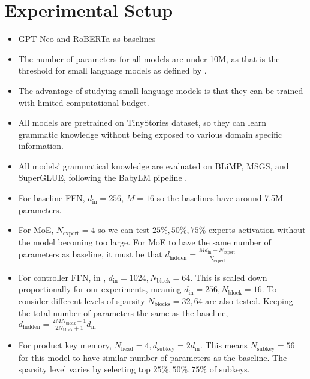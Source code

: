 \section{Experimental Setup}
\label{sec:setup}
\begin{itemize}
    \item GPT-Neo and RoBERTa as baselines
    \item The number of parameters for all models are under 10M, as that is the threshold for small language models as defined by \cite{eldan_tinystories_2023}.
    \item The advantage of studying small language models is that they can be trained with limited computational budget.
    \item All models are pretrained on TinyStories \cite{eldan_tinystories_2023} dataset, so they can learn grammatic knowledge without being exposed to various domain specific information.
    \item All models' grammatical knowledge are evaluated on BLiMP, MSGS, and SuperGLUE, following the BabyLM pipeline \cite{warstadt_findings_2023}.
    \item For baseline FFN, $d_\text{in} = 256$, $M=16$ so the baselines have around 7.5M parameters.
    \item For MoE, $N_\text{expert}=4$ so we can test $25\%, 50\%, 75\%$ experts activation without the model becoming too large. For MoE to have the same number of parameters as baseline, it must be that $d_\text{hidden} = \frac{Md_\text{in}-N_\text{expert}}{N_\text{expert}}$
    \item For controller FFN, in \cite{jaszczur_sparse_2021}, $d_\text{in} = 1024, N_\text{block}=64$. This is scaled down proportionally for our experiments, meaning $d_\text{in} = 256, N_\text{block}=16$. To consider different levels of sparsity $N_\text{blocks}=32,64$ are also tested. Keeping the total number of parameters the same as the baseline, $d_\text{hidden} = \frac{2MN_\text{block}-1}{2N_\text{block}+1}d_\text{in}$
    \item For product key memory, $N_\text{head}=4,d_\text{subkey}=2d_\text{in}$. This means $N_\text{subkey}= 56$ for this model to have similar number of parameters as the baseline. The sparsity level varies by selecting top $25\%, 50\%, 75\%$ of subkeys.
    
\end{itemize}
 